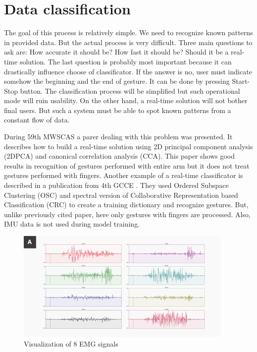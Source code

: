 \documentclass[conference,compsoc]{IEEEtran}
\begin{document}
\section{Data classification}

The goal of this process is relatively simple. We need to recognize known patterns in provided data. But the actual process is very difficult. Three main questions to ask are: How accurate it should be? How fast it should be? Should it be a real-time solution. The last question is probably most important because it can drastically influence choose of classificator. If the answer is no, user must indicate somehow the beginning and the end of gesture. It can be done by pressing Start-Stop button. The classification process will be simplified but such operational mode will ruin usability. On the other hand, a real-time solution will not bother final users. But such a system must be able to spot known patterns from a constant flow of data. 

During 59th MWSCAS a parer dealing with this problem \cite{algorithm_for_efficient_hci} was presented. It describes how to build a real-time solution using 2D principal component analysis (2DPCA) and canonical correlation analysis (CCA). This paper shows good results in recognition of gestures performed with entire arm but it does not treat gestures performed with fingers. 
Another example of a real-time classificator is described in a publication from 4th GCCE \cite{posture_and_gesture_recognition}.  They used Ordered Subspace Clustering (OSC) and spectral version of Collaborative Representation based Classification (CRC) to create a training dictionary and recognize gestures. But, unlike previously cited paper, here only gestures with fingers are processed. Also, IMU data is not used during model training.

\begin{figure}[h]
\caption{Visualization of 8 EMG signals}
\includegraphics[scale=0.8]{emgsig}
\centering
\end{figure}
\end{document}
